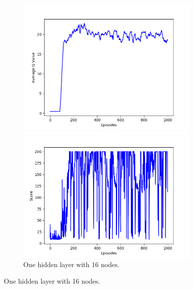 \documentclass{article}
\begin{document}
\begin{figure}[!htbp]
  \centering
  \begin{subfigure}{\textwidth}
    \begin{minipage}{0.5\textwidth}
      \centering
      \includegraphics[scale=0.45]{../experiments/nn_size_16/qvalues.png}
    \end{minipage}
    \begin{minipage}{0.5\textwidth}
      \centering
      \includegraphics[scale=0.45]{../experiments/nn_size_16/scores.png}
    \end{minipage}
    \caption{One hidden layer with 16 nodes.}
  \end{subfigure}%


\end{figure}
\end{document}
